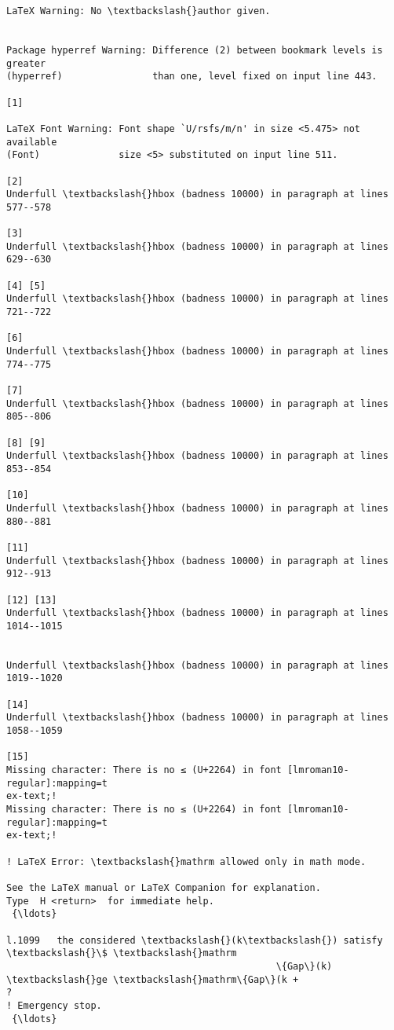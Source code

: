\documentclass[11pt]{article}
\begin{document}
\begin{Verbatim}[commandchars=\\\{\}]
LaTeX Warning: No \textbackslash{}author given.


Package hyperref Warning: Difference (2) between bookmark levels is greater
(hyperref)                than one, level fixed on input line 443.

[1]

LaTeX Font Warning: Font shape `U/rsfs/m/n' in size <5.475> not available
(Font)              size <5> substituted on input line 511.

[2]
Underfull \textbackslash{}hbox (badness 10000) in paragraph at lines 577--578

[3]
Underfull \textbackslash{}hbox (badness 10000) in paragraph at lines 629--630

[4] [5]
Underfull \textbackslash{}hbox (badness 10000) in paragraph at lines 721--722

[6]
Underfull \textbackslash{}hbox (badness 10000) in paragraph at lines 774--775

[7]
Underfull \textbackslash{}hbox (badness 10000) in paragraph at lines 805--806

[8] [9]
Underfull \textbackslash{}hbox (badness 10000) in paragraph at lines 853--854

[10]
Underfull \textbackslash{}hbox (badness 10000) in paragraph at lines 880--881

[11]
Underfull \textbackslash{}hbox (badness 10000) in paragraph at lines 912--913

[12] [13]
Underfull \textbackslash{}hbox (badness 10000) in paragraph at lines 1014--1015


Underfull \textbackslash{}hbox (badness 10000) in paragraph at lines 1019--1020

[14]
Underfull \textbackslash{}hbox (badness 10000) in paragraph at lines 1058--1059

[15]
Missing character: There is no ≤ (U+2264) in font [lmroman10-regular]:mapping=t
ex-text;!
Missing character: There is no ≤ (U+2264) in font [lmroman10-regular]:mapping=t
ex-text;!

! LaTeX Error: \textbackslash{}mathrm allowed only in math mode.

See the LaTeX manual or LaTeX Companion for explanation.
Type  H <return>  for immediate help.
 {\ldots}

l.1099   the considered \textbackslash{}(k\textbackslash{}) satisfy \textbackslash{}\$ \textbackslash{}mathrm
                                                \{Gap\}(k) \textbackslash{}ge \textbackslash{}mathrm\{Gap\}(k +
?
! Emergency stop.
 {\ldots}


\end{Verbatim}
\end{document}
